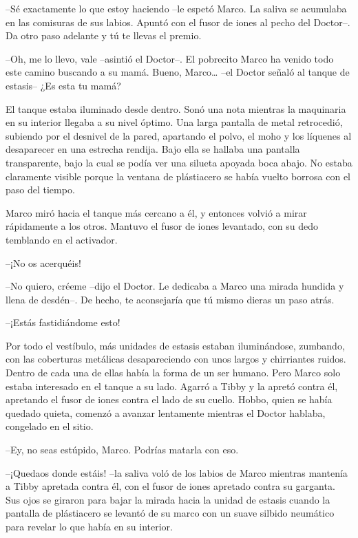 {--Sé exactamente lo que estoy haciendo --le espetó Marco. La saliva se
 acumulaba en las comisuras de sus labios. Apuntó con el fusor de iones
al pecho del Doctor--. Da otro paso adelante y tú te llevas el premio.}

{--Oh, me lo llevo, vale --asintió el Doctor--. El pobrecito Marco ha
 venido todo este camino buscando a su mamá. Bueno, Marco\ldots{} --el
Doctor señaló al tanque de estasis-- ¿Es esta tu mamá?}

{El tanque estaba iluminado desde dentro. Sonó una nota mientras la
 maquinaria en su interior llegaba a su nivel óptimo. Una larga pantalla
 de metal retrocedió, subiendo por el desnivel de la pared, apartando el
 polvo, el moho y los líquenes al desaparecer en una estrecha rendija.
 Bajo ella se hallaba una pantalla transparente, bajo la cual se podía
 ver una silueta apoyada boca abajo. No estaba claramente visible porque
 la ventana de plástiacero se había vuelto borrosa con el paso del
tiempo.}

{Marco miró hacia el tanque más cercano a él, y entonces volvió a mirar
 rápidamente a los otros. Mantuvo el fusor de iones levantado, con su
dedo temblando en el activador.}

{--¡No os acerquéis!}

{--No quiero, créeme --dijo el Doctor. Le dedicaba a Marco una mirada
 hundida y llena de desdén--. De hecho, te aconsejaría que tú mismo
dieras un paso atrás.}

{--¡Estás fastidiándome esto!}

{Por todo el vestíbulo, más unidades de estasis estaban iluminándose,
 zumbando, con las coberturas metálicas desapareciendo con unos largos y
 chirriantes ruidos. Dentro de cada una de ellas había la forma de un ser
 humano. Pero Marco solo estaba interesado en el tanque a su lado. Agarró
 a Tibby y la apretó contra él, apretando el fusor de iones contra el
 lado de su cuello. Hobbo, quien se había quedado quieta, comenzó a
avanzar lentamente mientras el Doctor hablaba, congelado en el sitio.}

{--Ey, no seas estúpido, Marco. Podrías matarla con eso.}

{--¡Quedaos donde estáis! --la saliva voló de los labios de Marco
 mientras mantenía a Tibby apretada contra él, con el fusor de iones
 apretado contra su garganta. Sus ojos se giraron para bajar la mirada
 hacia la unidad de estasis cuando la pantalla de plástiacero se levantó
 de su marco con un suave silbido neumático para revelar lo que había en
su interior.}

